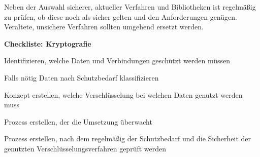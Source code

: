 Neben der Auswahl sicherer, aktueller Verfahren und Bibliotheken ist regelmäßig zu prüfen, ob diese noch als sicher gelten und den Anforderungen genügen. Veraltete, unsichere Verfahren sollten umgehend ersetzt werden.

\vspace{1em}
\textbf{Checkliste: Kryptografie}
\begin{checklist}
    \item Identifizieren, welche Daten und Verbindungen geschützt werden müssen
    \item Falls nötig Daten nach Schutzbedarf klassifizieren
    \item Konzept erstellen, welche Verschlüsselung bei welchen Daten genutzt werden muss
    \item Prozess erstellen, der die Umsetzung überwacht
    \item Prozess erstellen, nach dem regelmäßig der Schutzbedarf und die Sicherheit der genutzten Verschlüsselungsverfahren geprüft werden
\end{checklist}
